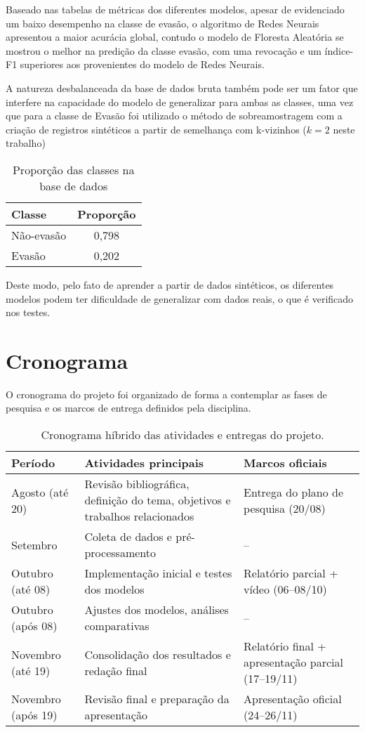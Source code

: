\documentclass[english, spanish, brazilian]{RBIEarticle} %
\begin{document}
Baseado nas tabelas de métricas dos diferentes modelos, apesar de evidenciado um baixo desempenho na classe de evasão, o algoritmo de Redes Neurais apresentou a maior acurácia global, contudo o modelo de Floresta Aleatória se mostrou o melhor na predição da classe evasão, com uma revocação e um índice-F1 superiores aos provenientes do modelo de Redes Neurais.

A natureza desbalanceada da base de dados bruta também pode ser um fator que interfere na capacidade do modelo de generalizar para ambas as classes, uma vez que para a classe de Evasão foi utilizado o método de sobreamostragem com a criação de registros sintéticos a partir de semelhança com k-vizinhos ($k=2$ neste trabalho)

\vspace{0.5cm}
\begin{table}[htbp]
\centering
\label{tab:proporcao}
\begin{tabular}{lc}
\hline
Classe & Proporção \\ \hline
Não-evasão  & 0,798 \\ 
Evasão      & 0,202 \\ \hline
\end{tabular}
\caption{Proporção das classes na base de dados}
\end{table}
\vspace{0.5cm}

Deste modo, pelo fato de aprender a partir de dados sintéticos, os diferentes modelos podem ter dificuldade de generalizar com dados reais, o que é verificado nos testes.


\pagebreak
\section{Cronograma}
O cronograma do projeto foi organizado de forma a contemplar as fases de pesquisa e os marcos de entrega definidos pela disciplina.
\begin{table}[h]
\centering
\begin{tabular}{p{3cm} p{7cm} p{5cm}}
\hline
\textbf{Período} & \textbf{Atividades principais} & \textbf{Marcos oficiais} \\
\hline
Agosto (até 20) & Revisão bibliográfica, definição do tema, objetivos e trabalhos relacionados & Entrega do plano de pesquisa (20/08) \\
Setembro        & Coleta de dados e pré-processamento & -- \\
Outubro (até 08) & Implementação inicial e testes dos modelos & Relatório parcial + vídeo (06--08/10) \\
Outubro (após 08) & Ajustes dos modelos, análises comparativas & -- \\
Novembro (até 19) & Consolidação dos resultados e redação final & Relatório final + apresentação parcial (17--19/11) \\
Novembro (após 19) & Revisão final e preparação da apresentação & Apresentação oficial (24--26/11) \\
\hline
\end{tabular}
\caption{Cronograma híbrido das atividades e entregas do projeto.}
\label{tab:cronograma}
\end{table}
\end{document}
